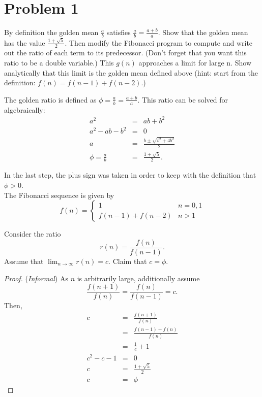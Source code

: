 \documentclass[aps,letterpaper,10pt]{article}
\begin{document}
\section{Problem 1}
\begin{center}
\begin{minipage}[h]{.85\linewidth}
By definition the golden mean $\frac{a}{b}$ satisfies $\frac{a}{b} = \frac{a+b}{a}$. Show that the golden mean has the value $\frac{1+\sqrt{5}}{2}$. Then modify the Fibonacci program to compute and write out the ratio of each term to its predecessor. (Don't forget that you want this ratio to be a double variable.)  This $g(n)$ approaches a limit for large n. Show analytically that this limit is the golden mean defined above (hint: start from the definition: $f(n) = f(n-1) + f(n-2)$.)
\end{minipage}

\end{center}


\vspace{2em}
The golden ratio is defined as $\phi = \frac{a}{b} = \frac{a + b}{a}$. This ratio can be solved for algebraically:
\begin{eqnarray*}
  a^2 & = & ab + b^2 \\
  a^2 - ab - b^2 & = & 0\\
  a & = & \frac{b \pm \sqrt{b^2 + 4b^2}}{2}\\
  \phi =  \frac{a}{b} & = & \frac{1 + \sqrt{5}}{2}.
\end{eqnarray*}

In the last step, the plus sign was taken in order to keep with the definition that $\phi>0$.\\

The Fibonacci sequence is given by 
\begin{displaymath}
  f(n) = \left\{
  \begin{array}{ll}
    1 &  n=0,1\\
    f(n-1) + f(n-2) & n>1
  \end{array}\right.
\end{displaymath}

Consider the ratio $$r(n) = \frac{f(n)}{f(n-1)}.$$ Assume that $\lim_{n\to\infty}r(n)=c$. Claim that $c=\phi$.\\

\begin{proof}
({\em Informal}) As $n$ is arbitrarily large, additionally assume $$\frac{f(n+1)}{f(n)} = \frac{f(n)}{f(n-1)} = c.$$ Then,
\begin{eqnarray*}
  c & = & \frac{f(n+1)}{f(n)}\\
    & = & \frac{f(n-1) + f(n)}{f(n)}\\
    & = & \frac{1}{c} + 1\\
  c^2 - c - 1 & = & 0\\
  c & = & \frac{1 + \sqrt{5}}{2}\\
  c & = & \phi
\end{eqnarray*}
\end{proof}
\end{document}
